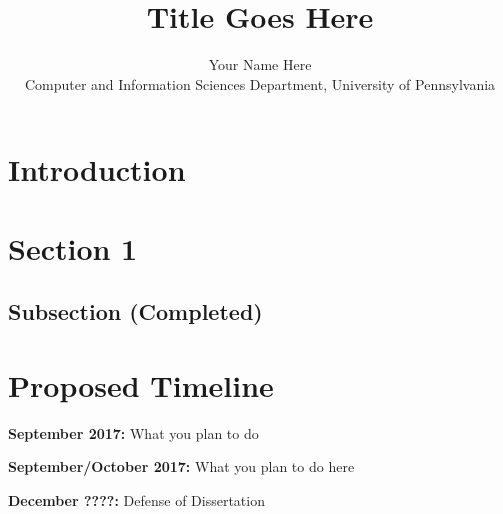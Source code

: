 \documentclass[11pt]{article}
\title{Title Goes Here}
\author{Your Name Here \\ Computer and Information Sciences Department, University of Pennsylvania}
\begin{document}
\maketitle

\section{Introduction}

\lipsum[1-3]
\cite{CocosAndCallisonBurch-2016:NAACL:ParaphraseClustering}

\section{Section 1}
\lipsum[6]

\subsection{Subsection (Completed)}
\lipsum[4]

\section{Proposed Timeline}
\noindent \textbf{September 2017:} What you plan to do

\noindent \textbf{September/October 2017:} What you plan to do here

\noindent \textbf{December ????:} Defense of Dissertation




\end{document}
